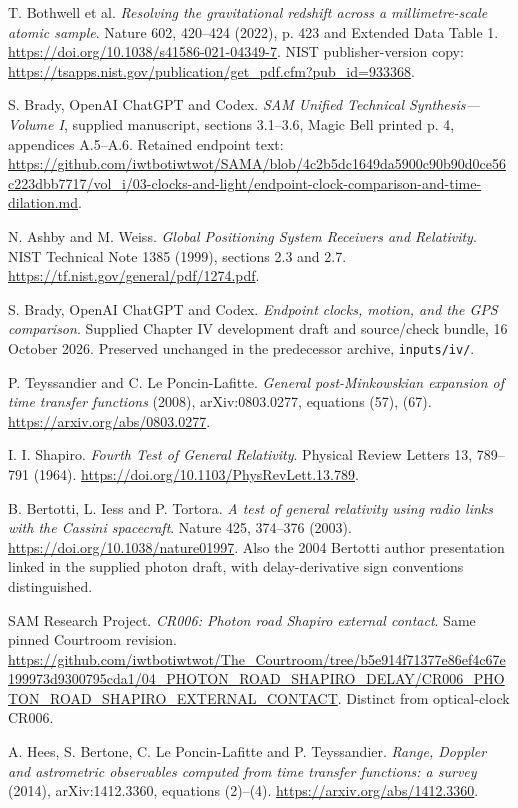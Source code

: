 \documentclass[10pt,twocolumn,letterpaper]{article}
\begin{document}
\noindent[8] T. Bothwell et al. \emph{Resolving the gravitational redshift across a millimetre-scale atomic sample}. Nature 602, 420--424 (2022), p. 423 and Extended Data Table 1. \url{https://doi.org/10.1038/s41586-021-04349-7}. NIST publisher-version copy: \url{https://tsapps.nist.gov/publication/get_pdf.cfm?pub_id=933368}.

\noindent[9] S. Brady, OpenAI ChatGPT and Codex. \emph{SAM Unified Technical Synthesis---Volume I}, supplied manuscript, sections 3.1--3.6, Magic Bell printed p. 4, appendices A.5--A.6. Retained endpoint text: \url{https://github.com/iwtbotiwtwot/SAMA/blob/4c2b5dc1649da5900c90b90d0ce56c223dbb7717/vol_i/03-clocks-and-light/endpoint-clock-comparison-and-time-dilation.md}.

\noindent[10] N. Ashby and M. Weiss. \emph{Global Positioning System Receivers and Relativity}. NIST Technical Note 1385 (1999), sections 2.3 and 2.7. \url{https://tf.nist.gov/general/pdf/1274.pdf}.

\noindent[11] S. Brady, OpenAI ChatGPT and Codex. \emph{Endpoint clocks, motion, and the GPS comparison}. Supplied Chapter IV development draft and source/check bundle, 16 October 2026. Preserved unchanged in the predecessor archive, \texttt{inputs/iv/}.

\noindent[12] P. Teyssandier and C. Le Poncin-Lafitte. \emph{General post-Minkowskian expansion of time transfer functions} (2008), arXiv:0803.0277, equations (57), (67). \url{https://arxiv.org/abs/0803.0277}.

\noindent[13] I. I. Shapiro. \emph{Fourth Test of General Relativity}. Physical Review Letters 13, 789--791 (1964). \url{https://doi.org/10.1103/PhysRevLett.13.789}.

\noindent[14] B. Bertotti, L. Iess and P. Tortora. \emph{A test of general relativity using radio links with the Cassini spacecraft}. Nature 425, 374--376 (2003). \url{https://doi.org/10.1038/nature01997}. Also the 2004 Bertotti author presentation linked in the supplied photon draft, with delay-derivative sign conventions distinguished.

\noindent[15] SAM Research Project. \emph{CR006: Photon road Shapiro external contact}. Same pinned Courtroom revision. \url{https://github.com/iwtbotiwtwot/The_Courtroom/tree/b5e914f71377e86ef4c67e199973d9300795cda1/04_PHOTON_ROAD_SHAPIRO_DELAY/CR006_PHOTON_ROAD_SHAPIRO_EXTERNAL_CONTACT}. Distinct from optical-clock CR006.

\noindent[16] A. Hees, S. Bertone, C. Le Poncin-Lafitte and P. Teyssandier. \emph{Range, Doppler and astrometric observables computed from time transfer functions: a survey} (2014), arXiv:1412.3360, equations (2)--(4). \url{https://arxiv.org/abs/1412.3360}.
\end{document}
